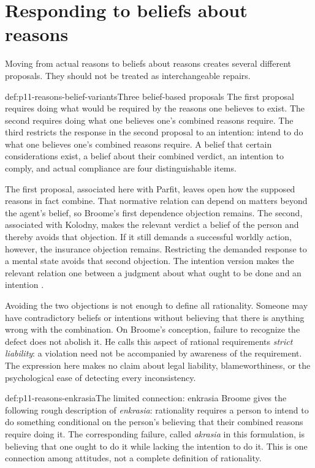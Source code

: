 \section{Responding to beliefs about reasons}
\label{sec:p11-reasons-believed}

Moving from actual reasons to beliefs about reasons creates several different
proposals. They should not be treated as interchangeable repairs.

\begin{hbdefinition}{def:p11-reasons-belief-variants}{Three belief-based proposals}
The first proposal requires doing what would be required by the reasons
one believes to exist. The second requires doing what one believes one's
combined reasons require. The third restricts the response in the second
proposal to an intention: intend to do what one believes one's combined
reasons require. A belief that certain considerations exist, a belief about
their combined verdict, an intention to comply, and actual compliance are
four distinguishable items.
\end{hbdefinition}

The first proposal, associated here with Parfit, leaves open how the supposed
reasons in fact combine. That normative relation can depend on matters beyond
the agent's belief, so Broome's first dependence objection remains. The
second, associated with Kolodny, makes the relevant verdict a belief of
the person and thereby avoids that objection. If it still demands a
successful worldly action, however, the insurance objection remains.
Restricting the demanded response to a mental state avoids that second
objection. The intention version makes the relevant relation one between
a judgment about what ought to be done and an intention
\parencite[p.~134]{Broome2021ReasonsRationality}.

Avoiding the two objections is not enough to define all rationality.
Someone may have contradictory beliefs or intentions without believing that
there is anything wrong with the combination. On Broome's conception,
failure to recognize the defect does not abolish it. He calls this aspect
of rational requirements \emph{strict liability}: a violation need not be
accompanied by awareness of the requirement. The expression here makes
no claim about legal liability, blameworthiness, or the psychological ease
of detecting every inconsistency.

\begin{hbdefinition}{def:p11-reasons-enkrasia}{The limited connection: enkrasia}
Broome gives the following rough description of \emph{enkrasia}: rationality
requires a person to intend to do something conditional on the person's
believing that their combined reasons require doing it. The corresponding
failure, called \emph{akrasia} in this formulation, is believing that one ought to do it while
lacking the intention to do it. This is one connection among attitudes,
not a complete definition of rationality.
\end{hbdefinition}

